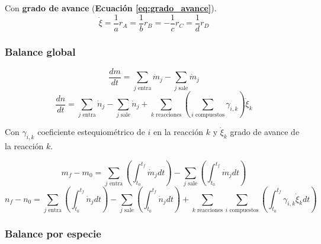         Con \textbf{grado de avance} (\textbf{Ecuación \ref{eq:grado_avance}}).
        \begin{equation}
        \label{eq:grado_avance}
            \dot{\xi} = \frac{1}{a} r_{A} = \frac{1}{b} r_{B} = -\frac{1}{c} r_{C} = \frac{1}{d} r_{D}
        \end{equation}
        
        \subsubsection{Balance global}
        
            \begin{equation}
            \label{eq:bm_rxn_global_diff}
                \frac{dm}{dt} = \sum_{j \text{ entra}} \dot{m}_{j} - \sum_{j \text{ sale}} \dot{m}_{j}
            \end{equation}
            \begin{equation}
            \label{eq:bm_rxn_global_diff_mol}
                \frac{dn}{dt} = \sum_{j \text{ entra}} \dot{n}_{j} - \sum_{j \text{ sale}} \dot{n}_{j} + \sum_{k \text{ reacciones}} \left ( \sum_{i \text{ compuestos}} \gamma_{i,k} \right ) \dot{\xi}_{k}
            \end{equation}
            
            Con \(\gamma_{i,k}\) coeficiente estequiométrico de \(i\) en la reacción \(k\) y \(\dot{\xi}_{k}\) grado de avance de la reacción \(k\).
            
            \begin{equation}
            \label{eq:bm_rxn_global_int}
                m_{f} - m_{0} = \sum_{j \text{ entra}} \left ( \int_{t_{0}}^{t_{f}} \dot{m}_{j} dt \right ) - \sum_{j \text{ sale}} \left ( \int_{t_{0}}^{t_{f}} \dot{m}_{j} dt \right )
            \end{equation}
            \begin{equation}
            \label{eq:bm_rxn_global_int_mol}
                n_{f} - n_{0} = \sum_{j \text{ entra}} \left ( \int_{t_{0}}^{t_{f}} \dot{n}_{j} dt \right ) - \sum_{j \text{ sale}} \left ( \int_{t_{0}}^{t_{f}} \dot{n}_{j} dt \right ) + \sum_{k \text{ reacciones}} \sum_{i \text{ compuestos}} \left ( \int_{t_{0}}^{t_{f}} \gamma_{i,k} \dot{\xi}_{k} dt \right )
            \end{equation}
        
        \subsubsection{Balance por especie}
        
